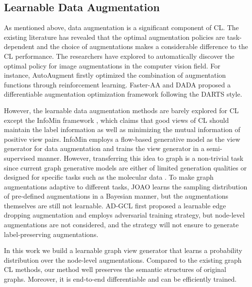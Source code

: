 \subsection{Learnable Data Augmentation}

As mentioned above, data augmentation is a significant component of CL. The existing literature \cite{chen2020simclr,you2020graphcl} has revealed that the optimal augmentation policies are task-dependent and the choice of augmentations makes a considerable difference to the CL performance. The researchers have explored to automatically discover the optimal policy for image augmentations in the computer vision field. For instance, AutoAugment \cite{cubuk2019autoaugment} firstly optimized the combination of augmentation functions through reinforcement learning. Faster-AA \cite{hataya2020fasteraa} and DADA \cite{li2020dada} proposed a differentiable augmentation optimization framework following the DARTS \cite{liu2018darts} style. 

However, the learnable data augmentation methods are barely explored for CL except the InfoMin framework \cite{tian2020goodview}, which claims that good views of CL should maintain the label information as well as minimizing the mutual information of positive view pairs. InfoMin employs a flow-based generative model as the view generator for data augmentation and trains the view generator in a semi-supervised manner. However, transferring this idea to graph is a non-trivial task since current graph generative models are either of limited generation qualities \cite{kipf2016vgae} or designed for specific tasks such as the molecular data \cite{de2018molgan, madhawa2019graphnvp, wang2021molecular}. To make graph augmentations adaptive to different tasks, JOAO \cite{you2021joao} learns the sampling distribution of pre-defined augmentations in a Bayesian manner, but the augmentations themselves are still not learnable. AD-GCL \cite{suresh2021adgcl} first proposed a learnable edge dropping augmentation and employs adversarial training strategy, but node-level augmentations are not considered, and the strategy will not ensure to generate label-preserving augmentations.

In this work we build a learnable graph view generator that learns a probability distribution over the node-level augmentations. Compared to the existing graph CL methods, our method well preserves the semantic structures of original graphs. Moreover, it is end-to-end differentiable and can be efficiently trained. 

